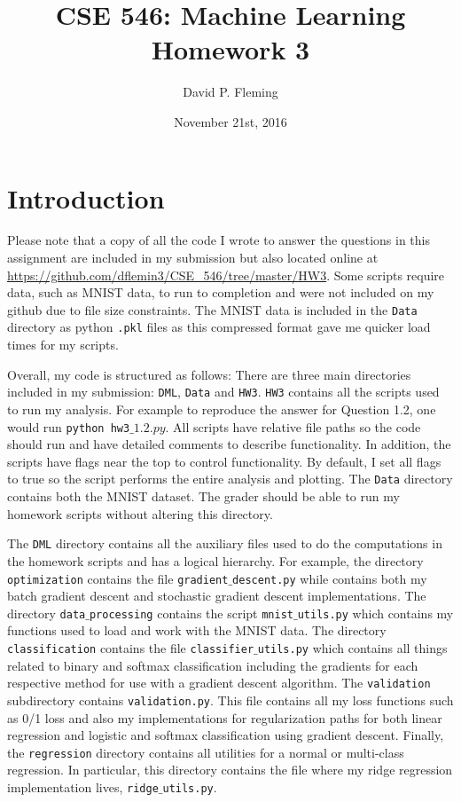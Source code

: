 \documentclass[12pt]{amsart}
\title{CSE 546: Machine Learning Homework 3}
\author{David P. Fleming}
\date{November 21st, 2016}
\begin{document}
\maketitle
\tableofcontents

\section*{Introduction}

Please note that a copy of all the code I wrote to answer the questions in this assignment are included in my submission but also located online at \url{https://github.com/dflemin3/CSE_546/tree/master/HW3}.  Some scripts require data, such as MNIST data, to run to completion and were not included on my github due to file size constraints.  The MNIST data is included in the {\tt Data} directory as python {\tt .pkl} files as this compressed format gave me quicker load times for my scripts.

Overall, my code is structured as follows:  There are three main directories included in my submission: {\tt DML}, {\tt Data} and {\tt HW3}. {\tt HW3} contains all the scripts used to run my analysis.  For example to reproduce the answer for Question 1.2, one would run {\tt python hw3$\_1.2.py$}.  All scripts have relative file paths so the code should run and have detailed comments to describe functionality.  In addition, the scripts have flags near the top to control functionality.  By default, I set all flags to true so the script performs the entire analysis and plotting.  The {\tt Data} directory contains both the MNIST dataset. The grader should be able to run my homework scripts without altering this directory.  

The {\tt DML} directory contains all the auxiliary files used to do the computations in the homework scripts and has a logical hierarchy.  For example, the directory {\tt optimization} contains the file {\tt gradient$\_$descent.py} while contains both my batch gradient descent and stochastic gradient descent implementations.  The directory {\tt data$\_$processing} contains the script {\tt mnist$\_$utils.py} which contains my functions used to load and work with the MNIST data.  The directory {\tt classification} contains the file {\tt classifier$\_$utils.py} which contains all things related to binary and softmax classification including the gradients for each respective method for use with a gradient descent algorithm.  The {\tt validation} subdirectory contains {\tt validation.py}.  This file contains all my loss functions such as 0/1 loss and also my implementations for regularization paths for both linear regression and logistic and softmax classification using gradient descent.  Finally, the {\tt regression} directory contains all utilities for a normal or multi-class regression.  In particular, this directory contains the file where my ridge regression implementation lives, {\tt ridge$\_$utils.py}. 
\end{document}
